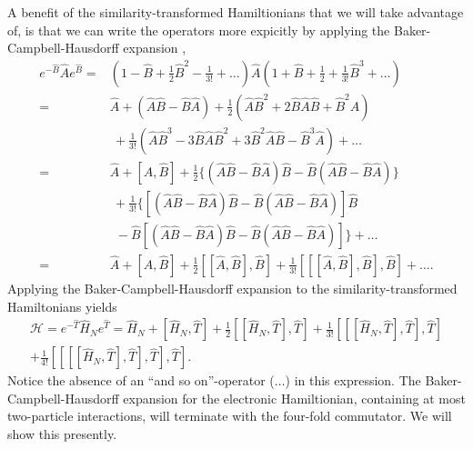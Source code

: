 A benefit of the similarity-transformed Hamiltionians that we will take advantage of,
is that we can write the operators
more expicitly by applying the Baker-Campbell-Hausdorff
expansion \cite{campbell1897law,baker1905alternants,hausdorff1906symbolische},
\begin{equation}
    \begin{aligned}
        e^{-\hat{B}}\hat{A}e^{\hat{B}}
        =& (1 - \hat{B} + \frac{1}{2}\hat{B}^2 - \frac{1}{3!} + \dots)
        \hat{A} (1 + \hat{B} + \frac{1}{2} + \frac{1}{3!}\hat{B}^3 + \dots) \\
        =& \hat{A} + (\hat{A}\hat{B} - \hat{B}\hat{A}) 
        + \frac{1}{2}(\hat{A}\hat{B}^2 + 2\hat{B}\hat{A}\hat{B} + \hat{B}^2\hat{A})
        \\ &\ + \frac{1}{3!}(
            \hat{A}\hat{B}^3 - 3\hat{B}\hat{A}\hat{B}^2 + 3\hat{B}^2\hat{A}\hat{B}
            - \hat{B}^3\hat{A}
        ) + \dots \\
        =& \hat{A} + [\hat{A}, \hat{B}] + 
        \frac{1}{2}\{
            (\hat{A}\hat{B} - \hat{B}\hat{A})\hat{B}
            -\hat{B}(\hat{A}\hat{B} - \hat{B}\hat{A})     
        \} \\ &\ + \frac{1}{3!} \{
            [(\hat{A}\hat{B} - \hat{B}\hat{A})\hat{B}
            -\hat{B}(\hat{A}\hat{B} - \hat{B}\hat{A})] \hat{B}\\
            &\ \ -\hat{B}[(\hat{A}\hat{B} - \hat{B}\hat{A})\hat{B}
            -\hat{B}(\hat{A}\hat{B} - \hat{B}\hat{A})]
        \} + \dots \\
        =& \hat{A} + [\hat{A}, \hat{B}]
        + \frac{1}{2}[[\hat{A}, \hat{B}], \hat{B}]
        + \frac{1}{3!} [[[\hat{A}, \hat{B}], \hat{B}], \hat{B}] + \dots .
    \end{aligned}
\end{equation}
Applying the Baker-Campbell-Hausdorff expansion to the similarity-transformed 
Hamiltonians yields
\begin{equation}
    \begin{gathered}
    \label{eq:bch_hamiltonian}
    \mathscr{H} = 
    e^{-\hat{T}}\hat{H}_Ne^{\hat{T}} = \hat{H}_N + [\hat{H}_N, \hat{T}]
        + \frac{1}{2}[[\hat{H}_N, \hat{T}], \hat{T}]
        + \frac{1}{3!}[[[\hat{H}_N, \hat{T}], \hat{T}], \hat{T}] \\
        + \frac{1}{4!}[[[[\hat{H}_N, \hat{T}], \hat{T}], \hat{T}], \hat{T}].
    \end{gathered}
\end{equation}
Notice the absence of an ``and so on''-operator ($\dots$) in this expression. The Baker-Campbell-Hausdorff expansion 
for the electronic Hamiltionian, containing at most two-particle interactions, will 
terminate with the four-fold commutator. We will show this presently.

